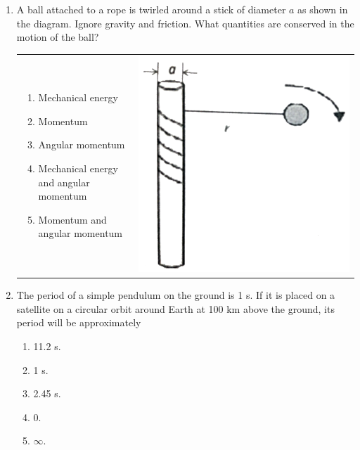 \documentclass[12pt,letterpaper]{article}
\begin{document}
\begin{enumerate}
\item
A ball attached to a rope is twirled around a stick of diameter $a$ as shown in the diagram. Ignore gravity and friction. What quantities are conserved in the motion of the ball?

\begin{tabular}{l r}

\begin{minipage}{0.6\textwidth}
\begin{enumerate}
\item Mechanical energy
\item Momentum
\item Angular momentum
\item Mechanical energy and angular momentum
\item Momentum and angular momentum
\end{enumerate}
\end{minipage} &
\begin{minipage}{0.3\textwidth}
\includegraphics[width=\textwidth]{twirl.png}
\end{minipage}
\end{tabular}

\item
The period of a simple pendulum on the ground is 1 s. If it is placed on a satellite on a circular orbit around Earth at 100 km above the ground, its period will be approximately
\begin{enumerate}
\item 11.2 s.
\item 1 s.
\item 2.45 s.
\item 0.
\item $\infty$.
\end{enumerate}


\end{enumerate}
\end{document}
